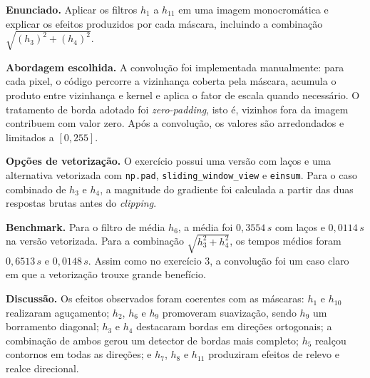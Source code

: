 \documentclass[12pt,a4paper]{article}
\newcommand{\campo}[2]{\textbf{#1.} #2\par}
\begin{document}
\campo{Enunciado}{Aplicar os filtros $h_1$ a $h_{11}$ em uma imagem monocromática e explicar os efeitos produzidos por cada máscara, incluindo a combinação $\sqrt{(h_3)^2 + (h_4)^2}$.}
\campo{Abordagem escolhida}{A convolução foi implementada manualmente: para cada pixel, o código percorre a vizinhança coberta pela máscara, acumula o produto entre vizinhança e kernel e aplica o fator de escala quando necessário. O tratamento de borda adotado foi \textit{zero-padding}, isto é, vizinhos fora da imagem contribuem com valor zero. Após a convolução, os valores são arredondados e limitados a $[0,255]$.}
\campo{Opções de vetorização}{O exercício possui uma versão com laços e uma alternativa vetorizada com \texttt{np.pad}, \texttt{sliding\_window\_view} e \texttt{einsum}. Para o caso combinado de $h_3$ e $h_4$, a magnitude do gradiente foi calculada a partir das duas respostas brutas antes do \textit{clipping}.}
\campo{Benchmark}{Para o filtro de média $h_6$, a média foi $0{,}3554\,s$ com laços e $0{,}0114\,s$ na versão vetorizada. Para a combinação $\sqrt{h_3^2 + h_4^2}$, os tempos médios foram $0{,}6513\,s$ e $0{,}0148\,s$. Assim como no exercício 3, a convolução foi um caso claro em que a vetorização trouxe grande benefício.}
\campo{Discussão}{Os efeitos observados foram coerentes com as máscaras: $h_1$ e $h_{10}$ realizaram aguçamento; $h_2$, $h_6$ e $h_9$ promoveram suavização, sendo $h_9$ um borramento diagonal; $h_3$ e $h_4$ destacaram bordas em direções ortogonais; a combinação de ambos gerou um detector de bordas mais completo; $h_5$ realçou contornos em todas as direções; e $h_7$, $h_8$ e $h_{11}$ produziram efeitos de relevo e realce direcional.}
\end{document}
